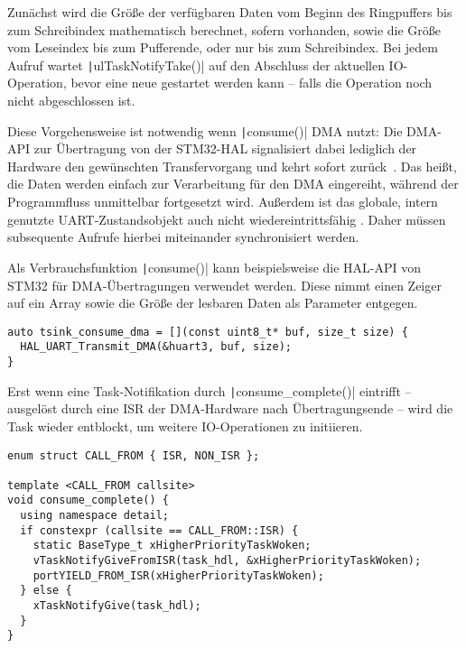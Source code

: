Zunächst wird die Größe der verfügbaren Daten vom Beginn des Ringpuffers bis zum
Schreibindex mathematisch berechnet, sofern vorhanden, sowie die Größe vom
Leseindex bis zum Pufferende, oder nur bis zum Schreibindex. Bei jedem Aufruf
wartet \texttt|ulTaskNotifyTake()| auf den Abschluss der aktuellen
IO-Operation, bevor eine neue gestartet werden kann -- falls die Operation noch
nicht abgeschlossen ist.

Diese Vorgehensweise ist notwendig wenn \texttt|consume()| DMA nutzt:
Die DMA-API zur Übertragung von der STM32-HAL signalisiert dabei lediglich der
Hardware den gewünschten Transfervorgang und kehrt sofort
zurück~\cite{HAL_UART_Transmit_DMA}. Das heißt, die Daten werden einfach zur
Verarbeitung für den DMA eingereiht, während der Programmfluss unmittelbar
fortgesetzt wird. Außerdem ist das globale, intern genutzte UART-Zustandsobjekt
auch nicht wiedereintrittsfähig\footnotemark{} \cite{stm32_hal_reentrancy}.
Daher müssen subsequente Aufrufe hierbei miteinander synchronisiert werden.


Als Verbrauchsfunktion \texttt|consume()| kann beispielsweise die
HAL-API von STM32 für DMA-Übertragungen verwendet werden. Diese nimmt einen
Zeiger auf ein Array sowie die Größe der lesbaren Daten als Parameter entgegen.

\begin{code}
\begin{verbatim}
auto tsink_consume_dma = [](const uint8_t* buf, size_t size) {
  HAL_UART_Transmit_DMA(&huart3, buf, size);
}
\end{verbatim}
    \label{code:consume_fn}
\end{code}

Erst wenn eine Task-Notifikation durch \texttt|consume_complete()|
eintrifft -- ausgelöst durch eine \ac{ISR} der DMA-Hardware nach
Übertragungsende -- wird die Task wieder entblockt, um weitere IO-Operationen zu
initiieren.

\begin{code}
\begin{verbatim}
enum struct CALL_FROM { ISR, NON_ISR };

template <CALL_FROM callsite>
void consume_complete() {
  using namespace detail;
  if constexpr (callsite == CALL_FROM::ISR) {
    static BaseType_t xHigherPriorityTaskWoken;
    vTaskNotifyGiveFromISR(task_hdl, &xHigherPriorityTaskWoken);
    portYIELD_FROM_ISR(xHigherPriorityTaskWoken);
  } else {
    xTaskNotifyGive(task_hdl);
  }
}
\end{verbatim}
\end{code}

